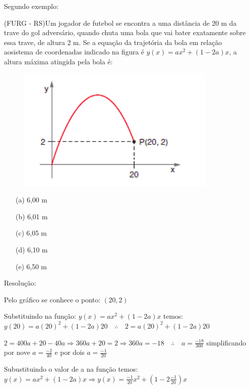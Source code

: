 \begin{multicols*}{2}
            Segundo exemplo: 
            
            (FURG - RS)Um jogador de futebol se encontra a uma distância de 20 m da trave do gol 					adversário, quando chuta uma bola que vai bater exatamente sobre essa trave, de altura 2 m. Se 			a equação da trajetória da bola em relação aosistema de coordenadas indicado na figura é
            $y(x) = ax^2 + (1-2a)x$, a altura máxima atingida pela bola é:
            \begin{figure}[H]
                \includegraphics[scale=0.5]{assets/rafael/img20.png}
            \end{figure}
            \begin{itemize}
            \item[(a)] 6,00 m
            \item[(b)] 6,01 m
            \item[(c)] 6,05 m
            \item[(d)] 6,10 m
            \item[(e)] 6,50 m
            \end{itemize}
            Resolução:
            
            Pelo gráfico se conhece o ponto: $(20,2)$
            
            Substituindo na função: $y(x) = ax^2 + (1-2a)x$ temos: $y(20) = a(20)^2 + (1-2a)20 \quad 				\therefore	\quad 2  = a(20)^2 + (1-2a)20 $
            
            $2 = 400a + 20 - 40a \Rightarrow 360a + 20 = 2 \Rightarrow 360a = -18 \quad \therefore \quad
            a = \frac{-18}{ 360}$ simplificando por nove $a = \frac{-2}{ 40}$ e por dois
            $a = \frac{-1}{ 20}$
            
            Subustituindo o valor de a na função temos:
            $y(x) = ax^2 + (1-2a)x \Rightarrow y(x) = \frac{-1}{20} x^2 + \left( 1-2 \frac{-1}{20} 
            \right)x $
            

\end{multicols*}

